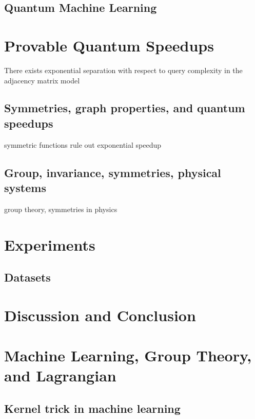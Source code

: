 \subsection{Quantum Machine Learning}

\section{Provable Quantum Speedups}\label{sec:speedup}
\begin{theorem}
	There exists exponential separation with respect to query complexity in the adjacency matrix model
\end{theorem}
\cite{zhengSpeedingLearningQuantum2022}

\subsection{Symmetries, graph properties, and quantum speedups}
symmetric functions rule out exponential speedup
\cite{ben-davidSymmetriesGraphProperties2020}

\subsection{Group, invariance, symmetries, physical systems}
group theory, 
\cite{kondorGroupTheoreticalMethods2008}
symmetries in physics
\cite{bogatskiyLorentzGroupEquivariant2020}

\section{Experiments}\label{sec:experiments}

\subsection{Datasets}

\section{Discussion and Conclusion}\label{sec:discussion}

\printbibliography
\appendix

\section{Machine Learning, Group Theory, and Lagrangian}
\subsection{Kernel trick in machine learning}
